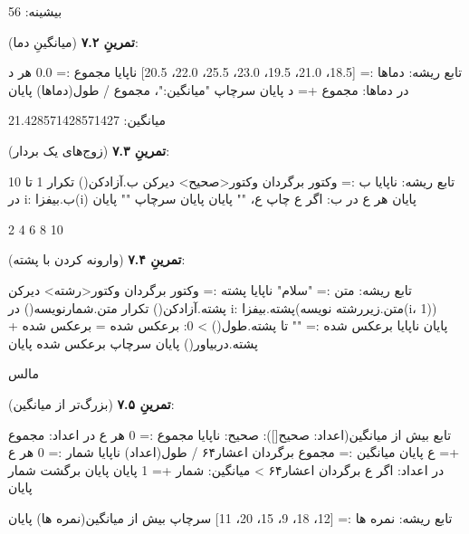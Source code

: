 \begin{progoutfa}
بیشینه: 56
\end{progoutfa}

\textbf{تمرینِ ۷.۲} (میانگینِ دما):
\begin{salamfa}
تابع ریشه:
    دماها := [18.5، 21.0، 19.5، 23.0، 25.5، 22.0، 20.5]
    ناپایا مجموع := 0.0
    هر د در دماها:
        مجموع += د
    پایان
    سرچاپ "میانگین:"، مجموع / طول(دماها)
پایان
\end{salamfa}

\begin{progoutfa}
میانگین: 21.428571428571427
\end{progoutfa}

\textbf{تمرینِ ۷.۳} (زوج‌های یک بردار):
\begin{salamfa}
تابع ریشه:
    ناپایا ب := وکتور {} برگردان وکتور<صحیح>
    دیرکن ب.آزادکن()
    تکرار 1 تا 10 در i:
        ب.بیفزا(i)
    پایان
    هر ع در ب:
        اگر ع %
            چاپ ع، ""
        پایان
    پایان
    سرچاپ ""
پایان
\end{salamfa}

\begin{progoutfa}
2 4 6 8 10
\end{progoutfa}

\textbf{تمرینِ ۷.۴} (وارونه کردن با پشته):
\begin{salamfa}
تابع ریشه:
    متن := "سلام"
    ناپایا پشته := وکتور {} برگردان وکتور<رشته>
    دیرکن پشته.آزادکن()
    تکرار متن.شمارنویسه() در i:
        پشته.بیفزا(متن.زیررشته نویسه(i، 1))
    پایان
    ناپایا برعکس شده := ""
    تا پشته.طول() > 0:
        برعکس شده = برعکس شده + پشته.دربیاور()
    پایان
    سرچاپ برعکس شده
پایان
\end{salamfa}

\begin{progoutfa}
مالس
\end{progoutfa}

\textbf{تمرینِ ۷.۵} (بزرگ‌تر از میانگین):
\begin{salamfa}
تابع بیش از میانگین(اعداد: صحیح[]): صحیح:
    ناپایا مجموع := 0
    هر ع در اعداد:
        مجموع += ع
    پایان
    میانگین := مجموع برگردان اعشار۶۴ / طول(اعداد)
    ناپایا شمار := 0
    هر ع در اعداد:
        اگر ع برگردان اعشار۶۴ > میانگین:
            شمار += 1
        پایان
    پایان
    برگشت شمار
پایان

تابع ریشه:
    نمره ها := [12، 18، 9، 15، 20، 11]
    سرچاپ بیش از میانگین(نمره ها)
پایان
\end{salamfa}


